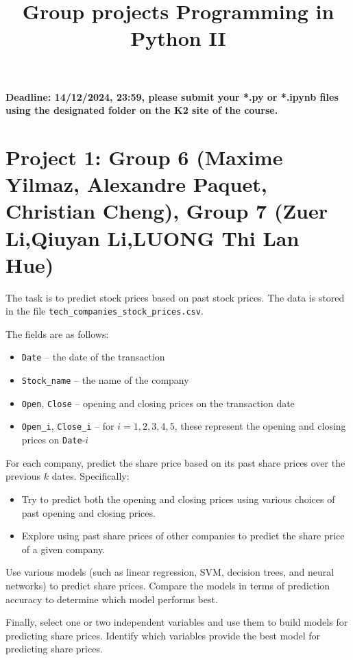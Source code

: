 \documentclass{article}
\title{Group projects Programming in Python II}
\author{}
\date{}
\begin{document}
\maketitle

\textbf{Deadline: 14/12/2024, 23:59,  please submit your *.py or *.ipynb files using the designated folder on the K2 site of the course.}



\section*{Project 1: Group 6 (Maxime Yilmaz, Alexandre Paquet, Christian Cheng), Group 7 (Zuer Li,Qiuyan Li,LUONG Thi Lan Hue) }
The task is to predict stock prices based on past stock prices. The data is stored in the file \lstinline$tech_companies_stock_prices.csv$.

The fields are as follows:
\begin{itemize} \item \lstinline$Date$ -- the date of the transaction 
\item \lstinline$Stock_name$ -- the name of the company 
\item \lstinline$Open$, \lstinline$Close$ -- opening and closing prices on the transaction date 
\item \lstinline$Open_i$, \lstinline$Close_i$ -- for $i=1,2,3,4,5$, these represent the opening and closing prices on \lstinline$Date$-$i$ 
\end{itemize}

For each company, predict the share price based on its past share prices over the previous $k$ dates. Specifically: 
\begin{itemize} 
\item Try to predict both the opening and closing prices using various choices of past opening and closing prices. 
\item Explore using past share prices of other companies to predict the share price of a given company. 
\end{itemize}

Use various models (such as linear regression, SVM, decision trees, and neural networks) to predict share prices. Compare the models in terms of prediction accuracy to determine which model performs best.

Finally, select one or two independent variables and use them to build models for predicting share prices. Identify which variables provide the best model for predicting share prices.
\end{document}
